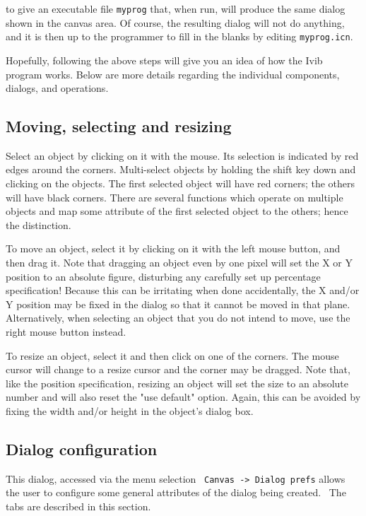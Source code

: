 
\noindent
to give an executable file \texttt{myprog} that, when run, will produce
the same dialog shown in the canvas area. Of course, the resulting
dialog will not do anything, and it is then up to the programmer to
fill in the blanks by editing \texttt{myprog.icn}.

Hopefully, following the above steps will give you an idea of how the
Ivib program works. Below are more details regarding the individual
components, dialogs, and operations.

\subsection*{Moving, selecting and resizing}

Select an object by clicking on it with the mouse. Its selection is
indicated by red edges around the corners. Multi-select objects by
holding the shift key down and clicking on the objects. The first
selected object will have red corners; the others will have black
corners. There are several functions which operate on multiple objects
and map some attribute of the first selected object to the others;
hence the distinction.

To move an object, select it by clicking on it with the left mouse
button, and then drag it. Note that dragging an object even by one
pixel will set the X or Y position to an absolute figure, disturbing
any carefully set up percentage specification! Because this can be
irritating when done accidentally, the X and/or Y position may be fixed
in the dialog so that it cannot be moved in that plane. Alternatively,
when selecting an object that you do not intend to move, use the right
mouse button instead.

To resize an object, select it and then click on one of the corners. The
mouse cursor will change to a resize cursor and the corner may be
dragged. Note that, like the position specification, resizing an object
will set the size to an absolute number and will also reset the
"use default" option. Again, this can be
avoided by fixing the width and/or height in the object's dialog box.

\subsection*{Dialog configuration}

This dialog, accessed via the menu selection \ \texttt{Canvas
-{\textgreater} Dialog prefs} allows the user to configure some general
attributes of the dialog being created. \ The tabs are described in
this section.

